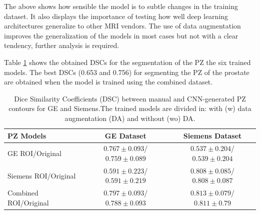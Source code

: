 The above shows how sensible the model is to subtle changes in the training dataset. It also displays the importance of testing how well deep learning architectures generalize to other MRI vendors.  The use of data augmentation improves the generalization of the models in most cases but not with a clear tendency, further analysis is required.

Table \ref{tab:res_pz} shows the obtained DSCs for the segmentation of the PZ the six trained models.  The best DSCs (0.653 and 0.756) for segmenting the PZ of the prostate are obtained when the model is trained using the combined dataset.  
 \begin{table}[h]
    \label{tab:res_pz}
    \caption{Dice Similarity Coefficients (DSC) between manual and CNN-generated PZ contours for GE and Siemens.The trained models are divided in: with (w) data augmentation (DA) and without (wo) DA.}
    \begin{tabular}{lcc}
         \hline
          \textbf{PZ Models} & \textbf{GE Dataset} & \textbf{Siemens Dataset}\\
         \hline
         GE ROI/Original & $0.767\pm0.093$/$0.759\pm0.089$ & $0.537\pm0.204$/$0.539\pm0.204$ \\
         \hline
         Siemens ROI/Original & $0.591\pm0.223$/$0.591\pm0.219$ & $0.808\pm0.085$/$0.808\pm0.087$ \\
         \hline
         Combined ROI/Original & $\mathbf{0.797\pm0.093}$/$0.788\pm0.093$ & $\mathbf{0.813\pm0.079}$/$0.811\pm0.79$\\
         \hline
    \end{tabular}
\end{table}

